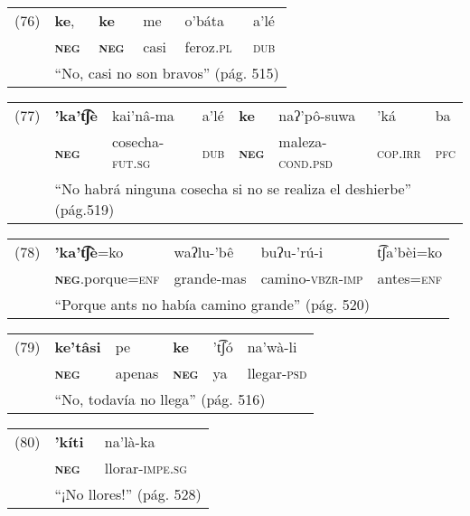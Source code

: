 {\setmainfont{Charis SIL} 

\begin{tabular}{llllll}
(76) & \textbf{ke}, & \textbf{ke} & me & o'báta & a'lé \\
& \textsc{\textbf{neg}} & \textsc{\textbf{neg}} & casi & feroz.\textsc{pl} & \textsc{dub}\\
& \multicolumn{5}{l}{``No, casi no son bravos'' (pág. 515)}
\end{tabular} \vspace{0.5cm}

\begin{tabular}{llllllll}
(77) & \textbf{'ka't͡ʃè} & kai'nâ-ma & a'lé & \textbf{ke} & naʔ'pô-suwa & 'ká & ba \\
& \textsc{\textbf{neg}} & cosecha-\textsc{fut.sg} & \textsc{dub} & \textsc{\textbf{neg}} & maleza-\textsc{cond.psd} & \textsc{cop.irr} & \textsc{pfc} \\
& \multicolumn{7}{l}{``No habrá ninguna cosecha si no se realiza el deshierbe'' (pág.519)}
\end{tabular} \vspace{0.5cm}

\begin{tabular}{lllll}
(78) & \textbf{'ka't͡ʃè}=ko & waʔlu-'bê & buʔu-'rú-i & t͡ʃa'bèi=ko  \\
& \textsc{\textbf{neg}}.porque=\textsc{enf} & grande-mas & camino-\textsc{vbzr-imp} & antes=\textsc{enf} \\
& \multicolumn{4}{l}{``Porque ants no había camino grande'' (pág. 520)}
\end{tabular} \vspace{0.5cm}

\begin{tabular}{llllll}
(79) & \textbf{ke'tâsi} & pe & \textbf{ke} & 't͡ʃó & na'wà-li \\
& \textsc{\textbf{neg}} & apenas & \textsc{\textbf{neg}} & ya & llegar-\textsc{psd} \\
& \multicolumn{5}{l}{``No, todavía no llega'' (pág. 516)}
\end{tabular} \vspace{0.5cm}

\begin{tabular}{lll}
(80) & \textbf{'kíti} & na'là-ka \\
& \textsc{\textbf{neg}} & llorar-\textsc{impe.sg}\\
& \multicolumn{2}{l}{``¡No llores!'' (pág. 528)}
\end{tabular} \vspace{0.5cm}

}

